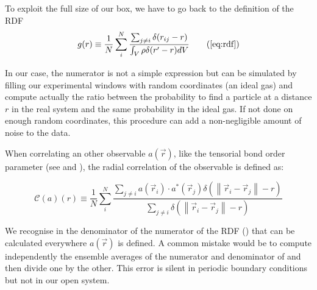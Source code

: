 To exploit the full size of our box, we have to go back to the definition of the \ac{RDF}
\begin{equation}
	g(r) \equiv \frac{1}{N} \sum_{i}^N \frac{
		\sum_{j\neq i} \delta(r_{ij} - r)
		}{
		\int_V \rho \delta(r^\prime-r) dV
		}
	\tag{\ref{eq:rdf}}
\end{equation}

In our case, the numerator is not a simple expression but can be simulated by filling our experimental windows with random coordinates (an ideal gas) and compute actually the ratio between the probability to find a particle at a distance $r$ in the real system and the same probability in the ideal gas. If not done on enough random coordinates, this procedure can add a non-negligible amount of noise to the data.

When correlating an other observable $a(\vec{r})$, like the tensorial bond order parameter (see  and ), the radial correlation of the observable is defined as:

\begin{equation}
	\mathcal{C}(a)(r) \equiv \frac{1}{N}\sum_i^N \frac{
		\sum_{j\neq i}{ a(\vec{r}_i) \cdot a^*(\vec{r}_j) \delta\left(\left\|\vec{r}_i-\vec{r}_j \right\| - r \right)}
	}{
	\sum_{j \neq i}{\delta\left(\left\|\vec{r}_i-\vec{r}_j \right\| - r \right)}
	}
	\label{eq:obervable_correlation}
\end{equation}

We recognise in the denominator of  the numerator of the \ac{RDF} () that can be calculated everywhere $a(\vec{r})$ is defined. A common mistake would be to compute independently the ensemble averages of the numerator and denominator of  and then divide one by the other. This error is silent in periodic boundary conditions but not in our open system.
